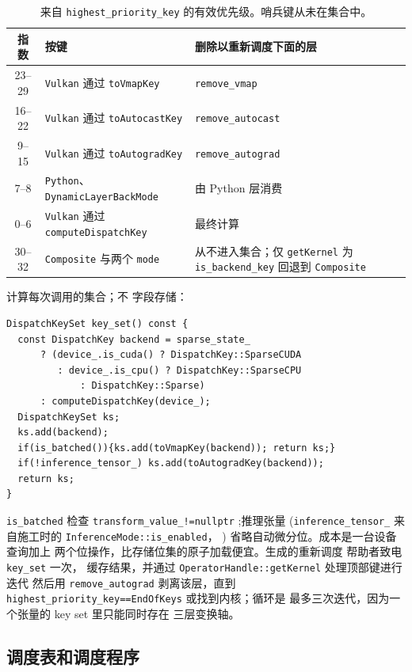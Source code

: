 \begin{table}[H]
\centering
\caption{来自 \texttt{highest\_priority\_key} 的有效优先级。哨兵键从未在集合中。}
\label{tab:keypriority}
\small
\begin{tabular}{cll}
\toprule
指数 & 按键 & 删除以重新调度下面的层 \\
\midrule
23--29 & \texttt{Vulkan} 通过 \texttt{toVmapKey} & \texttt{remove\_vmap} \\
16--22 & \texttt{Vulkan} 通过 \texttt{toAutocastKey} & \texttt{remove\_autocast} \\
9--15 & \texttt{Vulkan} 通过 \texttt{toAutogradKey} & \texttt{remove\_autograd} \\
7--8 & \texttt{Python}、\texttt{DynamicLayerBackMode} & 由 Python 层消费 \\
0--6 & \texttt{Vulkan} 通过 \texttt{computeDispatchKey} & 最终计算 \\
30--32 & \texttt{Composite} 与两个 \texttt{mode} & 从不进入集合；仅 \texttt{getKernel} 为 \texttt{is\_backend\_key} 回退到 \texttt{Composite} \\
\bottomrule
\end{tabular}
\end{table}

计算每次调用的集合；不
字段存储：

\begin{lstlisting}[caption={computed, not stored.}, label=lst:implkeyset]
DispatchKeySet key_set() const {
  const DispatchKey backend = sparse_state_
      ? (device_.is_cuda() ? DispatchKey::SparseCUDA
         : device_.is_cpu() ? DispatchKey::SparseCPU
             : DispatchKey::Sparse)
      : computeDispatchKey(device_);
  DispatchKeySet ks;
  ks.add(backend);
  if(is_batched()){ks.add(toVmapKey(backend)); return ks;}
  if(!inference_tensor_) ks.add(toAutogradKey(backend));
  return ks;
}
\end{lstlisting}

\texttt{is\_batched} 检查 \texttt{transform\_value\_!=nullptr}
;推理张量 (\texttt{inference\_tensor\_}
来自施工时的 \texttt{InferenceMode::is\_enabled}，
) 省略自动微分位。成本是一台设备查询加上
两个位操作，比存储位集的原子加载便宜。生成的重新调度
帮助者致电 \texttt{key\_set} 一次，
缓存结果，并通过 \texttt{OperatorHandle::getKernel} 处理顶部键进行迭代
然后用 \texttt{remove\_autograd} 剥离该层，直到
\texttt{highest\_priority\_key==EndOfKeys} 或找到内核；循环是
最多三次迭代，因为一个张量的 key set 里只能同时存在
三层变换轴。

\subsection{调度表和调度程序}
\label{sec:dispatcher}

